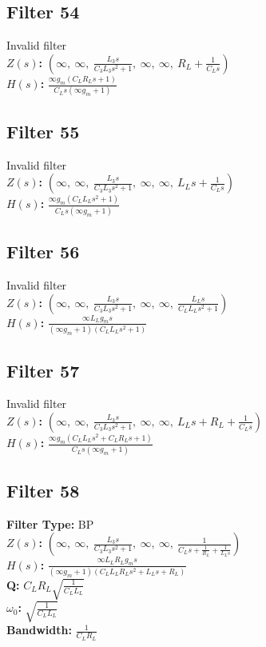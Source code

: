 \documentclass{article}
\begin{document}
\subsection*{Filter 54}
Invalid filter \\ 
\textbf{$Z(s)$:} $\left( \infty, \  \infty, \  \frac{L_{3} s}{C_{3} L_{3} s^{2} + 1}, \  \infty, \  \infty, \  R_{L} + \frac{1}{C_{L} s}\right)$ \\ 
\textbf{$H(s)$:} $\frac{\infty g_{m} \left(C_{L} R_{L} s + 1\right)}{C_{L} s \left(\infty g_{m} + 1\right)}$ \\ 
\subsection*{Filter 55}
Invalid filter \\ 
\textbf{$Z(s)$:} $\left( \infty, \  \infty, \  \frac{L_{3} s}{C_{3} L_{3} s^{2} + 1}, \  \infty, \  \infty, \  L_{L} s + \frac{1}{C_{L} s}\right)$ \\ 
\textbf{$H(s)$:} $\frac{\infty g_{m} \left(C_{L} L_{L} s^{2} + 1\right)}{C_{L} s \left(\infty g_{m} + 1\right)}$ \\ 
\subsection*{Filter 56}
Invalid filter \\ 
\textbf{$Z(s)$:} $\left( \infty, \  \infty, \  \frac{L_{3} s}{C_{3} L_{3} s^{2} + 1}, \  \infty, \  \infty, \  \frac{L_{L} s}{C_{L} L_{L} s^{2} + 1}\right)$ \\ 
\textbf{$H(s)$:} $\frac{\infty L_{L} g_{m} s}{\left(\infty g_{m} + 1\right) \left(C_{L} L_{L} s^{2} + 1\right)}$ \\ 
\subsection*{Filter 57}
Invalid filter \\ 
\textbf{$Z(s)$:} $\left( \infty, \  \infty, \  \frac{L_{3} s}{C_{3} L_{3} s^{2} + 1}, \  \infty, \  \infty, \  L_{L} s + R_{L} + \frac{1}{C_{L} s}\right)$ \\ 
\textbf{$H(s)$:} $\frac{\infty g_{m} \left(C_{L} L_{L} s^{2} + C_{L} R_{L} s + 1\right)}{C_{L} s \left(\infty g_{m} + 1\right)}$ \\ 
\subsection*{Filter 58}
\textbf{Filter Type:} BP \\ 
\textbf{$Z(s)$:} $\left( \infty, \  \infty, \  \frac{L_{3} s}{C_{3} L_{3} s^{2} + 1}, \  \infty, \  \infty, \  \frac{1}{C_{L} s + \frac{1}{R_{L}} + \frac{1}{L_{L} s}}\right)$ \\ 
\textbf{$H(s)$:} $\frac{\infty L_{L} R_{L} g_{m} s}{\left(\infty g_{m} + 1\right) \left(C_{L} L_{L} R_{L} s^{2} + L_{L} s + R_{L}\right)}$ \\ 
\textbf{Q:} $C_{L} R_{L} \sqrt{\frac{1}{C_{L} L_{L}}}$ \\ 
\textbf{$\omega_0$:} $\sqrt{\frac{1}{C_{L} L_{L}}}$ \\ 
\textbf{Bandwidth:} $\frac{1}{C_{L} R_{L}}$ \\ 
\end{document}
